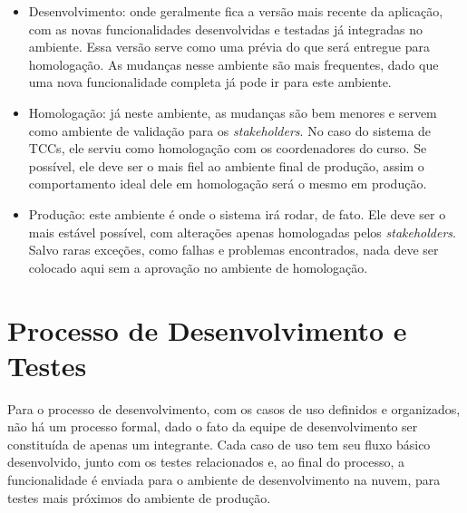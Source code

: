 \begin{itemize}
    \item Desenvolvimento: onde geralmente fica a versão mais recente da aplicação, com as novas funcionalidades desenvolvidas e testadas já integradas no ambiente. Essa versão serve como uma prévia do que será entregue para homologação. As mudanças nesse ambiente são mais frequentes, dado que uma nova funcionalidade completa já pode ir para este ambiente.

    \item Homologação: já neste ambiente, as mudanças são bem menores e servem como ambiente de validação para os \textit{stakeholders}. No caso do sistema de TCCs, ele serviu como homologação com os coordenadores do curso. Se possível, ele deve ser o mais fiel ao ambiente final de produção, assim o comportamento ideal dele em homologação será o mesmo em produção.

    \item Produção: este ambiente é onde o sistema irá rodar, de fato. Ele deve ser o mais estável possível, com alterações apenas homologadas pelos \textit{stakeholders}. Salvo raras exceções, como falhas e problemas encontrados, nada deve ser colocado aqui sem a aprovação no ambiente de homologação.
\end{itemize}

\section{Processo de Desenvolvimento e Testes}
Para o processo de desenvolvimento, com os casos de uso definidos e organizados, não há um processo formal, dado o fato da equipe de desenvolvimento ser constituída de apenas um integrante. Cada caso de uso tem seu fluxo básico desenvolvido, junto com os testes relacionados e, ao final do processo, a funcionalidade é enviada para o ambiente de desenvolvimento na nuvem, para testes mais próximos do ambiente de produção.